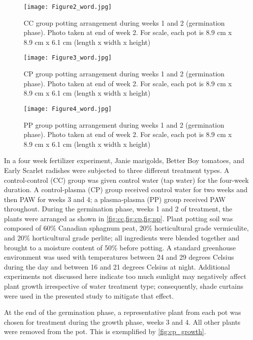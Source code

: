 \begin{figure}[htbp]
  \centering
  \texttt{[image: Figure2\_word.jpg]}
  \caption{CC group potting arrangement during weeks 1 and 2 (germination phase).  Photo taken at end of week 2. For scale, each pot is 8.9 cm x 8.9 cm x 6.1 cm (length x width x height)}
  \label{fig:cc}
\end{figure}

\begin{figure}[htbp]
  \centering
  \texttt{[image: Figure3\_word.jpg]}
  \caption{CP group potting arrangement during weeks 1 and 2 (germination phase). Photo taken at end of week 2. For scale, each pot is 8.9 cm x 8.9 cm x 6.1 cm (length x width x height)}
  \label{fig:cp}
\end{figure}

\begin{figure}[htbp]
  \centering
  \texttt{[image: Figure4\_word.jpg]}
  \caption{PP group potting arrangement during weeks 1 and 2 (germination phase). Photo taken at end of week 2. For scale, each pot is 8.9 cm x 8.9 cm x 6.1 cm (length x width x height)}
  \label{fig:pp}
\end{figure}

In a four week fertilizer experiment, Janie marigolds, Better Boy tomatoes, and Early Scarlet radishes were subjected to three different treatment types.  A control-control (CC) group was given control water (tap water) for the four-week duration.  A control-plasma (CP) group received control water for two weeks and then PAW for weeks 3 and 4; a plasma-plasma (PP) group received PAW throughout.  During the germination phase, weeks 1 and 2 of treatment, the plants were arranged as shown in \cref{fig:cc,fig:cp,fig:pp}.  Plant potting soil was composed of 60\% Canadian sphagnum peat, 20\% horticultural grade vermiculite, and 20\% horticultural grade perlite; all ingredients were blended together and brought to a moisture content of 50\% before potting.  A standard greenhouse environment was used with temperatures between 24 and 29 degrees Celsius during the day and between 16 and 21 degrees Celsius at night.  Additional experiments not discussed here indicate too much sunlight may negatively affect plant growth irrespective of water treatment type; consequently, shade curtains were used in the presented study to mitigate that effect.

At the end of the germination phase, a representative plant from each pot was chosen for treatment during the growth phase, weeks 3 and 4.  All other plants were removed from the pot.  This is exemplified by \cref{fig:cp_growth}.

